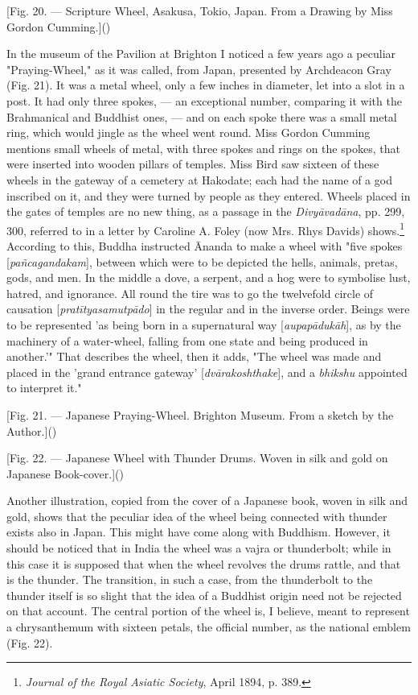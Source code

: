 \documentclass[a4paper, 11pt, oneside, polutonikogreek, english]{article}
\begin{document}
[Fig. 20. --- Scripture Wheel, Asakusa, Tokio, Japan. From a Drawing by Miss Gordon Cumming.]()

In the museum of the Pavilion at Brighton I noticed a few years ago a peculiar "Praying-Wheel," as it was called, from Japan, presented by Archdeacon Gray (Fig. 21). It was a metal wheel, only a few inches in diameter, let into a slot in a post. It had only three spokes, --- an exceptional number, comparing it with the Brahmanical and Buddhist ones, --- and on each spoke there was a small metal ring, which would jingle as the wheel went round. Miss Gordon Cumming mentions small wheels of metal, with three spokes and rings on the spokes, that were inserted into wooden pillars of temples. Miss Bird saw sixteen of these wheels in the gateway of a cemetery at Hakodate; each had the name of a god inscribed on it, and they were turned by people as they entered. Wheels placed in the gates of temples are no new thing, as a passage in the \emph{Divyāvadāna}, pp. 299, 300, referred to in a letter by Caroline A. Foley (now Mrs. Rhys Davids) shows.\footnote{\emph{Journal of the Royal Asiatic Society}, April 1894, p. 389.} According to this, Buddha instructed Ānanda to make a wheel with "five spokes [\emph{pañcagandakam}], between which were to be depicted the hells, animals, pretas, gods, and men. In the middle a dove, a serpent, and a hog were to symbolise lust, hatred, and ignorance. All round the tire was to go the twelvefold circle of causation [\emph{pratītyasamutpādo}] in the regular and in the inverse order. Beings were to be represented 'as being born in a supernatural way [\emph{aupapādukāh}], as by the machinery of a water-wheel, falling from one state and being produced in another.'" That describes the wheel, then it adds, "The wheel was made and placed in the 'grand entrance gateway' [\emph{dvārakoshthake}], and a \emph{bhikshu} appointed to interpret it."

[Fig. 21. --- Japanese Praying-Wheel. Brighton Museum. From a sketch by the Author.]()

[Fig. 22. --- Japanese Wheel with Thunder Drums. Woven in silk and gold on Japanese Book-cover.]()

Another illustration, copied from the cover of a Japanese book, woven in silk and gold, shows that the peculiar idea of the wheel being connected with thunder exists also in Japan. This might have come along with Buddhism. However, it should be noticed that in India the wheel was a vajra or thunderbolt; while in this case it is supposed that when the wheel revolves the drums rattle, and that is the thunder. The transition, in such a case, from the thunderbolt to the thunder itself is so slight that the idea of a Buddhist origin need not be rejected on that account. The central portion of the wheel is, I believe, meant to represent a chrysanthemum with sixteen petals, the official number, as the national emblem (Fig. 22).
\end{document}
